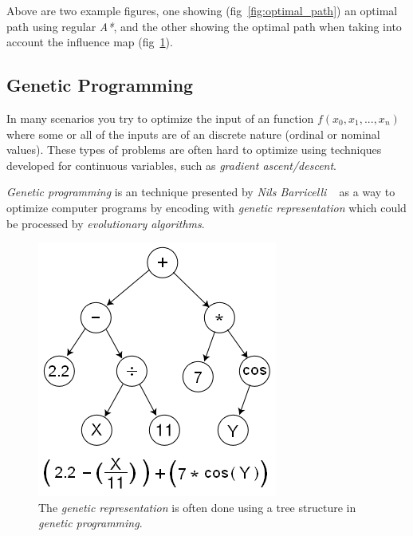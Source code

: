 \documentclass[a4paper, twocolumn]{article}
\begin{document}
\begin{minipage}{\linewidth}
\begin{minipage}{0.4\linewidth}
\begin{figure}[H]
		\caption{}
		\label{fig:smart_path}
	\end{figure}
	\end{minipage}
\end{minipage}
	Above are two example figures, one showing (fig~\ref{fig:optimal_path}) an optimal path using regular \emph{A*}, and the other showing the optimal path when taking into account the influence map (fig~\ref{fig:smart_path}).
	
	\subsection{Genetic Programming} \label{sec:genetic_programming}

	In many scenarios you try to optimize the input of an function \(f(x_0,x_1,...,x_n)\) where some or all of the inputs are of an discrete nature (ordinal or nominal values). These types of problems are often hard to optimize using techniques developed for continuous variables, such as \emph{gradient ascent/descent}.

	\emph{Genetic programming} is an technique presented by \emph{Nils Barricelli} ~\cite{barricelli1954esempi} as a way to optimize computer programs by encoding with \emph{genetic representation} which could be processed by \emph{evolutionary algorithms}. 

	\begin{figure}[H]
		\includegraphics[width=0.8\linewidth]{share/Genetic_Program_Tree.png}
		\caption{The \emph{genetic representation} is often done using a tree structure in \emph{genetic programming}.}
		\label{fig:genetic_representation}
	\end{figure}
\end{document}
